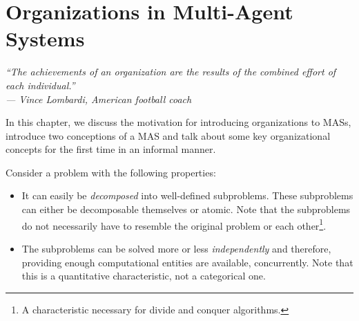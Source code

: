 
\chapter{Organizations in Multi-Agent Systems}

\begin{flushright}
\textit{``The achievements of an organization are the results of the combined effort of each individual.''}\\
\textit{--- Vince Lombardi, American football coach}
\end{flushright}

In this chapter, we discuss the motivation for introducing organizations to MASs, introduce two conceptions of a MAS and talk about some key organizational concepts for the first time in an informal manner.

Consider a problem with the following properties:
\begin{itemize}
	\item It can easily be \textit{decomposed} into well-defined subproblems. These subproblems can either be decomposable themselves or atomic.
	Note that the subproblems do not necessarily have to resemble the original problem or each other\footnote{A characteristic necessary for divide and conquer algorithms.}.
	\item The subproblems can be solved more or less \textit{independently} and therefore, providing enough computational entities are available, concurrently.
	Note that this is a quantitative characteristic, not a categorical one.
\end{itemize}

